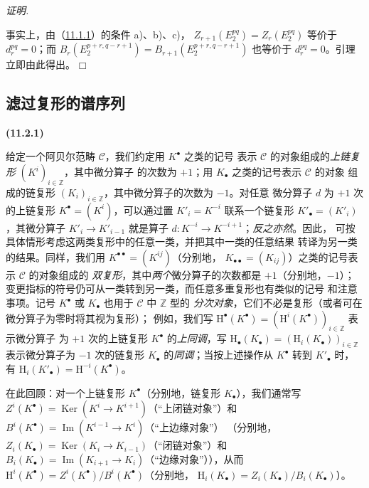 \documentclass[UTF8,fontset=none,11pt,oneside,openany]{ctexbook}
\providecommand{\square}{\mdlgwhtsquare}
\newenvironment{env}[1][]{%
  \par\medskip\noindent\textbf{(#1)}\ %
}{\par}
\newenvironment{proof}{%
  \par\smallskip\noindent\textit{证明.}\ %
}{\hfill$\square$\par}
\newcommand{\oldpage}[2][]{%
  \hypertarget{ega-source-page-#1-#2}{}%
  \marginnote{\scriptsize\textbf{#1}~|~#2}\ignorespaces}
\let\EGAOriginalLabel\label
\renewcommand{\label}[1]{\phantomsection\EGAOriginalLabel{#1}}
\begin{document}
\begin{proof}
\oldpage[0\textsubscript{III}]{27}
事实上，由（\hyperref[0.11.1.1-fr]{11.1.1}）的条件 a)、b)、c)，
$Z_{r+1}(E_2^{pq})=Z_r(E_2^{pq})$ 等价于 $d_r^{pq}=0$；而
$B_r(E_2^{p+r,q-r+1})=B_{r+1}(E_2^{p+r,q-r+1})$
也等价于 $d_r^{pq}=0$。引理立即由此得出。
\end{proof}

\subsection{滤过复形的谱序列}
\label{subsection:0.11.2-fr}

\begin{env}[11.2.1]
\label{0.11.2.1-fr}
给定一个阿贝尔范畴 $\mathcal C$，我们约定用 $K^\bullet$ 之类的记号
表示 $\mathcal C$ 的对象组成的\emph{上链复形} $(K^i)_{i\in\mathbb Z}$，其中微分算子
的次数为 $+1$；用 $K_\bullet$ 之类的记号表示 $\mathcal C$ 的对象
组成的链复形 $(K_i)_{i\in\mathbb Z}$，其中微分算子的次数为 $-1$。对任意
微分算子 $d$ 为 $+1$ 次的上链复形 $K^\bullet=(K^i)$，可以通过置
$K'_i=K^{-i}$ 联系一个链复形 $K'_\bullet=(K'_i)$，其微分算子
$K'_i\to K'_{i-1}$ 就是算子 $d:K^{-i}\to K^{-i+1}$；\emph{反之亦然}。因此，
可按具体情形考虑这两类复形中的任意一类，并把其中一类的任意结果
转译为另一类的结果。同样，我们用 $K^{\bullet\bullet}=(K^{ij})$（分别地，
$K_{\bullet\bullet}=(K_{ij})$）之类的记号表示 $\mathcal C$ 的对象组成的
\emph{双复形}，其中\emph{两个}微分算子的次数都是 $+1$（分别地，$-1$）；
变更指标的符号仍可从一类转到另一类，而任意多重复形也有类似的记号
和注意事项。记号 $K^\bullet$ 或 $K_\bullet$ 也用于 $\mathcal C$ 中 $\mathbb Z$ 型的
\emph{分次对象}，它们不必是复形（或者可在微分算子为零时将其视为复形）；
例如，我们写
$\mathrm H^\bullet(K^\bullet)=(\mathrm H^i(K^\bullet))_{i\in\mathbb Z}$ 表示微分算子
为 $+1$ 次的上链复形 $K^\bullet$ 的\emph{上同调}，写
$\mathrm H_\bullet(K_\bullet)=(\mathrm H_i(K_\bullet))_{i\in\mathbb Z}$ 表示微分算子为
$-1$ 次的链复形 $K_\bullet$ 的\emph{同调}；当按上述操作从 $K^\bullet$ 转到
$K'_\bullet$ 时，有 $\mathrm H_i(K'_\bullet)=\mathrm H^{-i}(K^\bullet)$。

在此回顾：对一个上链复形 $K^\bullet$（分别地，链复形 $K_\bullet$），我们通常写
$Z^i(K^\bullet)=\operatorname{Ker}(K^i\to K^{i+1})$（“上闭链对象”）和
$B^i(K^\bullet)=\operatorname{Im}(K^{i-1}\to K^i)$（“上边缘对象”）
（分别地，$Z_i(K_\bullet)=\operatorname{Ker}(K_i\to K_{i-1})$（“闭链对象”）和
$B_i(K_\bullet)=\operatorname{Im}(K_{i+1}\to K_i)$（“边缘对象”）），从而
$\mathrm H^i(K^\bullet)=Z^i(K^\bullet)/B^i(K^\bullet)$（分别地，
$\mathrm H_i(K_\bullet)=Z_i(K_\bullet)/B_i(K_\bullet)$）。


\end{env}
\end{document}

